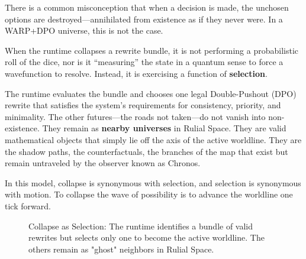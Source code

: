There is a common misconception that when a decision is made, the unchosen options are destroyed—annihilated from existence as if they never were. In a WARP+DPO universe, this is not the case.

When the runtime collapses a rewrite bundle, it is not performing a probabilistic roll of the dice, nor is it ``measuring'' the state in a quantum sense to force a wavefunction to resolve. Instead, it is exercising a function of \textbf{selection}.

The runtime evaluates the bundle and chooses one legal Double-Pushout (DPO) rewrite that satisfies the system's requirements for consistency, priority, and minimality. The other futures—the roads not taken—do not vanish into non-existence. They remain as \textbf{nearby universes} in Rulial Space. They are valid mathematical objects that simply lie off the axis of the active worldline. They are the shadow paths, the counterfactuals, the branches of the map that exist but remain untraveled by the observer known as Chronos.

In this model, collapse is synonymous with selection, and selection is synonymous with motion. To collapse the wave of possibility is to advance the worldline one tick forward.

\begin{figure}[h]
\centering
{}
\caption{Collapse as Selection: The runtime identifies a bundle of valid rewrites but selects only one to become the active worldline. The others remain as "ghost" neighbors in Rulial Space.}
\end{figure}

